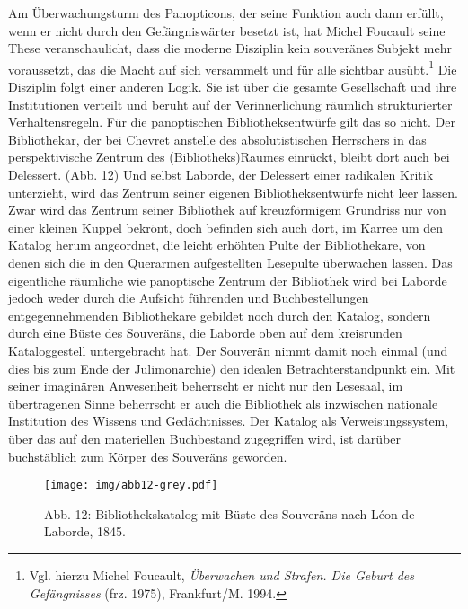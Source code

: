 Am Überwachungsturm des Panopticons, der seine Funktion auch dann
erfüllt, wenn er nicht durch den Gefängniswärter besetzt ist, hat Michel
Foucault seine These veranschaulicht, dass die moderne Disziplin kein
souveränes Subjekt mehr voraussetzt, das die Macht auf sich versammelt
und für alle sichtbar ausübt.\footnote{Vgl. hierzu Michel Foucault,
  \emph{Überwachen und Strafen. Die Geburt des Gefängnisses} (frz.
  1975), Frankfurt/M. 1994.} Die Disziplin folgt einer anderen Logik.
Sie ist über die gesamte Gesellschaft und ihre Institutionen verteilt
und beruht auf der Verinnerlichung räumlich strukturierter
Verhaltensregeln. Für die panoptischen Bibliotheksentwürfe gilt das so
nicht. Der Bibliothekar, der bei Chevret anstelle des absolutistischen
Herrschers in das perspektivische Zentrum des (Bibliotheks)Raumes
einrückt, bleibt dort auch bei Delessert. (Abb. 12) Und selbst Laborde,
der Delessert einer radikalen Kritik unterzieht, wird das Zentrum seiner
eigenen Bibliotheksentwürfe nicht leer lassen. Zwar wird das Zentrum
seiner Bibliothek auf kreuzförmigem Grundriss nur von einer kleinen
Kuppel bekrönt, doch befinden sich auch dort, im Karree um den Katalog
herum angeordnet, die leicht erhöhten Pulte der Bibliothekare, von denen
sich die in den Querarmen aufgestellten Lesepulte überwachen lassen. Das
eigentliche räumliche wie panoptische Zentrum der Bibliothek wird bei
Laborde jedoch weder durch die Aufsicht führenden und Buchbestellungen
entgegennehmenden Bibliothekare gebildet noch durch den Katalog, sondern
durch eine Büste des Souveräns, die Laborde oben auf dem kreisrunden
Kataloggestell untergebracht hat. Der Souverän nimmt damit noch einmal
(und dies bis zum Ende der Julimonarchie) den idealen
Betrachterstandpunkt ein. Mit seiner imaginären Anwesenheit beherrscht
er nicht nur den Lesesaal, im übertragenen Sinne beherrscht er auch die
Bibliothek als inzwischen nationale Institution des Wissens und
Gedächtnisses. Der Katalog als Verweisungssystem, über das auf den
materiellen Buchbestand zugegriffen wird, ist darüber buchstäblich zum
Körper des Souveräns geworden.

\begin{figure}[htbp]
\centering
\texttt{[image: img/abb12-grey.pdf]}
\caption*{Abb. 12: Bibliothekskatalog mit Büste des Souveräns nach Léon
de Laborde, 1845.}
\end{figure}

